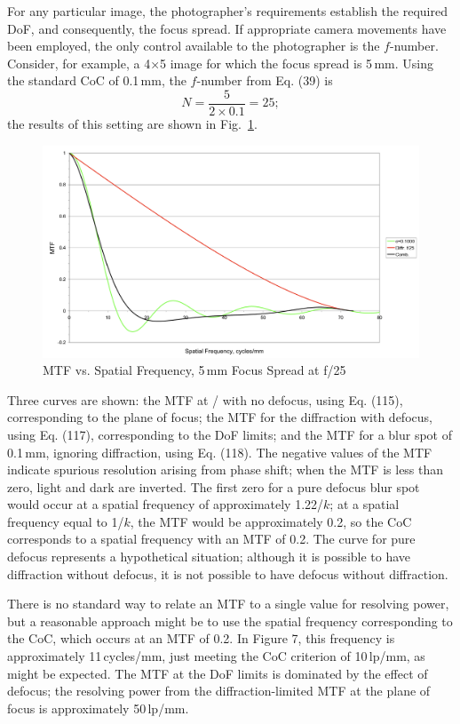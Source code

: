 \documentclass[11pt, oneside]{scrartcl}   	%
\newcommand{\f}[1]{\mbox{\raisebox{2pt}{\footnotesize $f$\hspace{-1.2pt}}/\hspace{-0.6pt}\raisebox{-0.6pt}{\small #1}}}
\begin{document}
For any particular image, the photographer’s requirements establish the required DoF, and consequently, the focus spread. If appropriate camera movements have been employed, the only control available to the photographer is the $f$-number. Consider, for example, a 4×5 image for which the focus spread is 5\,mm. Using the standard CoC of 0.1\,mm, the $f$-number from Eq. (39) is
\begin{equation}
N = \frac5{2×0.1} = 25; 
\end{equation}
the results of this setting are shown in Fig.~\ref{fig:MTFvssf25}.
\begin{figure}[htbp] %
   \centering
   \includegraphics[width=\linewidth]{figure/fig_dofd_7} 
   \caption{MTF vs. Spatial Frequency, 5\,mm Focus Spread at f/25}
   \label{fig:MTFvssf25}
\end{figure}
Three curves are shown: the MTF at \f{25} with no defocus, using Eq. (115), corresponding to the plane of focus; the MTF for the diffraction with defocus, using Eq. (117), corresponding to the DoF limits; and the MTF for a blur spot of 0.1\,mm, ignoring diffraction, using Eq. (118). The negative values of the MTF indicate spurious resolution arising from phase shift; when the MTF is less than zero, light and dark are inverted. The first zero for a pure defocus blur spot would occur at a spatial frequency of approximately 1.22/$k$; at a spatial frequency equal to 1/$k$, the MTF would be approximately 0.2, so the CoC corresponds to a spatial frequency with an MTF of 0.2. The curve for pure defocus represents a hypothetical situation; although it is possible to have diffraction without defocus, it is not possible to have defocus without diffraction.

There is no standard way to relate an MTF to a single value for resolving power, but a reasonable approach might be to use the spatial frequency corresponding to the CoC, which occurs at an MTF of 0.2. In Figure 7, this frequency is approximately 11\,cycles/mm, just meeting the CoC criterion of 10\,lp/mm, as might be expected. The MTF at the DoF limits is dominated by the effect of defocus; the resolving power from the diffraction-limited MTF at the plane of focus is approximately 50\,lp/mm.
\end{document}
